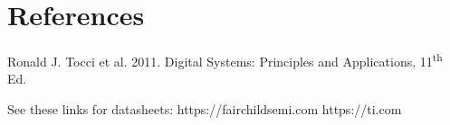 \documentclass[11pt,a4paper]{article}
\begin{document}
\section{References}
Ronald J. Tocci et al. 2011. Digital Systems: Principles and Applications, 11\textsuperscript{th} Ed.

See these links for datasheets:
https://fairchildsemi.com
https://ti.com
\end{document}
